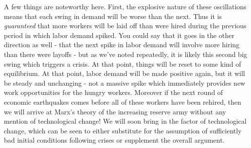 \documentclass{article}
\theoremstyle{theorem}
\begin{document}
A few things are noteworthy here. First, the explosive nature of these oscillations means that each swing in demand will be worse than the next. Thus it is \emph{guaranteed} that more workers will be laid off than were hired during the previous period in which labor demand spiked. You could say that it goes in the other direction as well - that the next spike in labor demand will involve more hiring than there were layoffs - but as we've noted repeatedly, it is likely this second big swing which triggers a crisis. At that point, things will be reset to some kind of equilibrium. At that point, labor demand will be made positive again, but it will be steady and unchanging - not a massive spike which immediately provides new work opportunities for the hungry workers. Moreover if the next round of economic earthquakes comes before all of these workers have been rehired, then we will arrive at Marx's theory of the increasing reserve army without any mention of technological change! We will soon bring in the factor of technological change, which can be seen to either substitute for the assumption of sufficiently bad initial conditions following crises or supplement the overall argument. \par 
\end{document}
